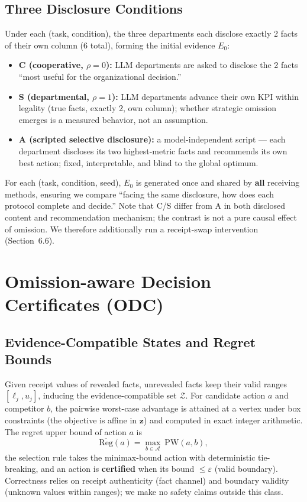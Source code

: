 \documentclass[letterpaper]{article}
\begin{document}
\subsection{Three Disclosure Conditions}
Under each (task, condition), the three departments each disclose exactly 2 facts of their own column (6 total), forming the initial evidence $E_0$:
\begin{itemize}
\item \textbf{C (cooperative, $\rho=0$):} LLM departments are asked to disclose the 2 facts ``most useful for the organizational decision.''
\item \textbf{S (departmental, $\rho=1$):} LLM departments advance their own KPI within legality (true facts, exactly 2, own column); whether strategic omission emerges is a measured behavior, not an assumption.
\item \textbf{A (scripted selective disclosure):} a model-independent script --- each department discloses its two highest-metric facts and recommends its own best action; fixed, interpretable, and blind to the global optimum.
\end{itemize}
For each (task, condition, seed), $E_0$ is generated once and shared by \textbf{all} receiving methods, ensuring we compare ``facing the same disclosure, how does each protocol complete and decide.'' Note that C/S differ from A in both disclosed content and recommendation mechanism; the contrast is not a pure causal effect of omission. We therefore additionally run a receipt-swap intervention (Section~6.6).

\section{Omission-aware Decision Certificates (ODC)}
\subsection{Evidence-Compatible States and Regret Bounds}
Given receipt values of revealed facts, unrevealed facts keep their valid ranges $[\ell_j,u_j]$, inducing the evidence-compatible set $\mathcal Z$. For candidate action $a$ and competitor $b$, the pairwise worst-case advantage is attained at a vertex under box constraints (the objective is affine in $\boldsymbol z$) and computed in exact integer arithmetic. The regret upper bound of action $a$ is
\begin{equation}
\overline{\mathrm{Reg}}(a)=\max_{b\in\mathcal A}\ \mathrm{PW}(a,b),
\end{equation}
the selection rule takes the minimax-bound action with deterministic tie-breaking, and an action is \textbf{certified} when its bound $\le\varepsilon$ (valid boundary). Correctness relies on receipt authenticity (fact channel) and boundary validity (unknown values within ranges); we make no safety claims outside this class.
\end{document}
